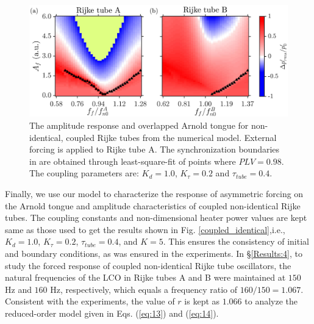 \documentclass[%
preprint,
 amsmath,amssymb,
 aps,
 pra,
]{revtex4-2}
\begin{document}
\begin{figure}[t!]
\centering
\includegraphics[scale=0.21]{fig12.jpg}
\caption{\label{coupled_non_identical}The amplitude response and overlapped Arnold tongue for non-identical, coupled Rijke tubes from the numerical model. External forcing is applied to Rijke tube A. The synchronization boundaries in are obtained through least-square-fit of points where $PLV=0.98$. The coupling parameters are: $K_d = 1.0$, $K_{\tau} = 0.2$ and $\tau_{tube} = 0.4$.}
\end{figure}

Finally, we use our model to characterize the response of asymmetric forcing on the Arnold tongue and amplitude characteristics of coupled non-identical Rijke tubes. The coupling constants and non-dimensional heater power values are kept same as those used to get the results shown in Fig. \ref{coupled_identical},i.e., $K_d = 1.0$, $K_{\tau} = 0.2$, $\tau_{tube} = 0.4$, and $K = 5$. This ensures the consistency of initial and boundary conditions, as was ensured in the experiments. In  \S \ref{Results:4}, to study the forced response of coupled non-identical Rijke tube oscillators, the natural frequencies of the LCO in Rijke tubes A and B were maintained at $150$ Hz and $160$ Hz, respectively, which equals a frequency ratio of $160/150 = 1.067$. Consistent with the experiments, the value of $r$ is kept as $1.066$ to analyze the reduced-order model given in Eqs. (\ref{eq:13}) and (\ref{eq:14}). 
\end{document}
